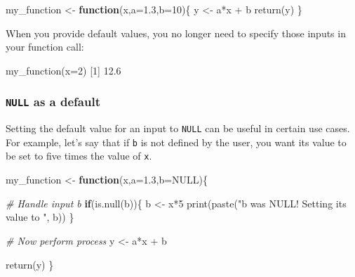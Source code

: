 \documentclass[
]{book}
\newenvironment{Shaded}{\begin{snugshade}}{\end{snugshade}}
\newcommand{\AttributeTok}[1]{\textcolor[rgb]{0.77,0.63,0.00}{#1}}
\newcommand{\CommentTok}[1]{\textcolor[rgb]{0.56,0.35,0.01}{\textit{#1}}}
\newcommand{\ConstantTok}[1]{\textcolor[rgb]{0.00,0.00,0.00}{#1}}
\newcommand{\ControlFlowTok}[1]{\textcolor[rgb]{0.13,0.29,0.53}{\textbf{#1}}}
\newcommand{\DecValTok}[1]{\textcolor[rgb]{0.00,0.00,0.81}{#1}}
\newcommand{\FloatTok}[1]{\textcolor[rgb]{0.00,0.00,0.81}{#1}}
\newcommand{\FunctionTok}[1]{\textcolor[rgb]{0.00,0.00,0.00}{#1}}
\newcommand{\NormalTok}[1]{#1}
\newcommand{\OtherTok}[1]{\textcolor[rgb]{0.56,0.35,0.01}{#1}}
\newcommand{\SpecialCharTok}[1]{\textcolor[rgb]{0.00,0.00,0.00}{#1}}
\newcommand{\StringTok}[1]{\textcolor[rgb]{0.31,0.60,0.02}{#1}}
\begin{document}
\begin{Shaded}
\begin{Highlighting}[]
\NormalTok{my\_function }\OtherTok{\textless{}{-}} \ControlFlowTok{function}\NormalTok{(x,}\AttributeTok{a=}\FloatTok{1.3}\NormalTok{,}\AttributeTok{b=}\DecValTok{10}\NormalTok{)\{}
\NormalTok{  y }\OtherTok{\textless{}{-}}\NormalTok{ a}\SpecialCharTok{*}\NormalTok{x }\SpecialCharTok{+}\NormalTok{ b}
  \FunctionTok{return}\NormalTok{(y)}
\NormalTok{\}}
\end{Highlighting}
\end{Shaded}

When you provide default values, you no longer need to specify those inputs in your function call:

\begin{Shaded}
\begin{Highlighting}[]
\FunctionTok{my\_function}\NormalTok{(}\AttributeTok{x=}\DecValTok{2}\NormalTok{)}
\NormalTok{[}\DecValTok{1}\NormalTok{] }\FloatTok{12.6}
\end{Highlighting}
\end{Shaded}

\hypertarget{null-as-a-default}{%
\subsubsection*{\texorpdfstring{\texttt{NULL} as a default}{NULL as a default}}\label{null-as-a-default}}

Setting the default value for an input to \texttt{NULL} can be useful in certain use cases. For example, let's say that if \texttt{b} is not defined by the user, you want its value to be set to five times the value of \texttt{x}.

\begin{Shaded}
\begin{Highlighting}[]
\NormalTok{my\_function }\OtherTok{\textless{}{-}} \ControlFlowTok{function}\NormalTok{(x,}\AttributeTok{a=}\FloatTok{1.3}\NormalTok{,}\AttributeTok{b=}\ConstantTok{NULL}\NormalTok{)\{}
  
  \CommentTok{\# Handle input \textasciigrave{}b\textasciigrave{}}
  \ControlFlowTok{if}\NormalTok{(}\FunctionTok{is.null}\NormalTok{(b))\{}
\NormalTok{    b }\OtherTok{\textless{}{-}}\NormalTok{ x}\SpecialCharTok{*}\DecValTok{5}
    \FunctionTok{print}\NormalTok{(}\FunctionTok{paste}\NormalTok{(}\StringTok{"b was NULL! Setting its value to "}\NormalTok{, b))}
\NormalTok{  \}}
  
  \CommentTok{\# Now perform process}
\NormalTok{  y }\OtherTok{\textless{}{-}}\NormalTok{ a}\SpecialCharTok{*}\NormalTok{x }\SpecialCharTok{+}\NormalTok{ b}
  
  \FunctionTok{return}\NormalTok{(y)}
\NormalTok{\}}
\end{Highlighting}
\end{Shaded}
\end{document}
